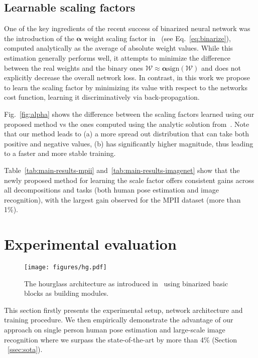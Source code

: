 \documentclass[10pt,twocolumn,letterpaper]{article}
\newcommand{\mytensor}[1]{\ensuremath{\mathcal{#1}}}
\newcommand{\myvector}[1]{\ensuremath{\mathbf{#1}}}
\begin{document}
\subsection{Learnable scaling factors}\label{ssec:learnable-scaling}

One of the key ingredients of the recent success of binarized neural network was the introduction of the $\myvector{\alpha}$ weight scaling factor in~\cite{rastegari2016xnor} (see Eq.~\ref{eq:binarize}), computed analytically as the average of absolute weight values. While this estimation generally performs well, it attempts to minimize the difference between the real weights and the binary ones $\mytensor{W} \approx \myvector{\alpha} \text{sign}(\mytensor{W})$ and does not explicitly decrease the overall network loss. In contrast, in this work we propose to learn the scaling factor by minimizing its value with respect to the networks cost function, learning it discriminatively via back-propagation.

Fig.~\ref{fig:alpha} shows the difference between the scaling factors learned using our proposed method vs the ones computed using the analytic solution from~\cite{rastegari2016xnor}. Note that our method leads to (a) a more spread out distribution that can take both positive and negative values, (b) has significantly higher magnitude, thus leading to a faster and more stable training.

Table~\ref{tab:main-results-mpii} and~\ref{tab:main-results-imagenet} show that the newly proposed method for learning the scale factor offers consistent gains across all decompositions and tasks (both human pose estimation and image recognition), with the largest gain observed for the MPII dataset (more than 1\%).
 \section{Experimental evaluation}\label{sec:experiments}

\begin{figure}
    \centering
    \texttt{[image: figures/hg.pdf]}
    \caption{The hourglass architecture as introduced in~\cite{newell2016stacked} using binarized basic blocks as building modules.}
    \label{fig:hg-arch}
\end{figure}

This section firstly presents the experimental setup, network architecture and training procedure. We then empirically demonstrate the advantage of our approach on single person human pose estimation and large-scale image recognition where we surpass the state-of-the-art by more than 4\% (Section ~\ref{ssec:sota}).
\end{document}
